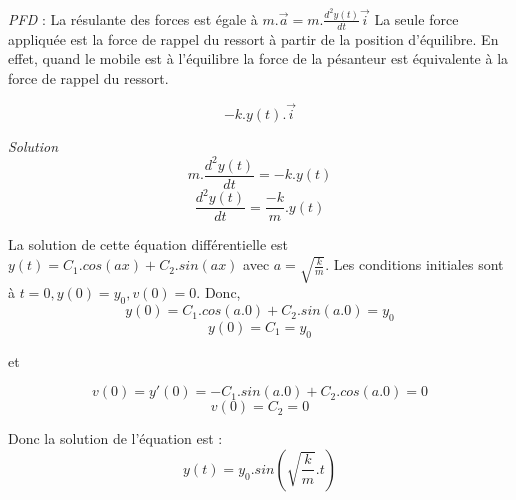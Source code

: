 \documentclass[]{book}
\theoremstyle{definition}
\begin{document}
\emph{PFD} : La r\'esulante des forces est \'egale \`a 
$m.\overrightarrow{a}=m.\frac{d^2y(t)}{dt}\overrightarrow{i}$
La seule force appliqu\'ee est la force de rappel du ressort \`a partir de la position d'\'equilibre. En effet, quand le mobile est \`a l'\'equilibre la force de la p\'esanteur est \'equivalente \`a la force de rappel du ressort.

$$-k.y(t).\overrightarrow{i}$$


\emph{Solution}
$$m.\frac{d^2y(t)}{dt} = -k.y(t)$$
$$\frac{d^2y(t)}{dt} = \frac{-k}{m}.y(t)$$

La solution de cette \'equation diff\'erentielle est $y(t) = C_1.cos(ax) + C_2.sin(ax)$ avec $a = \sqrt{\frac{k}{m}}$. Les conditions initiales sont \`a $t=0, y(0) = y_0, v(0) = 0$. Donc,
$$y(0) = C_1.cos(a.0) + C_2.sin(a.0) = y_0$$
$$y(0) = C_1 = y_0$$

et

$$v(0) = y'(0) = -C_1.sin(a.0) +C_2.cos(a.0) = 0$$
$$v(0) = C_2 = 0$$

Donc la solution de l'\'equation est :
$$y(t) = y_0.sin(\sqrt{\frac{k}{m}}.t)$$
\end{document}
